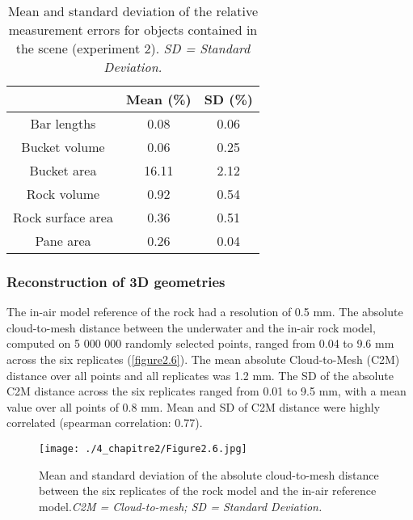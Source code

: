 \begin{table}[htbp]
  \centering
  \normalsize
  \caption[Mean and standard deviation of the relative measurement errors for objects contained in the scene]{Mean and standard deviation of the relative measurement errors for objects contained in the scene (experiment 2). \textit{SD = Standard Deviation.}}
  \label{table2.6}
  
\begin{tabular}{*{3}{c}}
        \toprule
                          & \textbf{Mean (\%)} & \textbf{SD (\%)} \\ \midrule
        Bar lengths       & 0.08               & 0.06             \\
        Bucket volume     & 0.06               & 0.25             \\
        Bucket area       & 16.11              & 2.12             \\
        Rock volume       & 0.92               & 0.54             \\
        Rock surface area & 0.36               & 0.51             \\
        Pane area         & 0.26               & 0.04             \\ \bottomrule
    \end{tabular}
\end{table}

\subsubsection{Reconstruction of 3D geometries}\label{chapitre2_3.2.3}
The in-air model reference of the rock had a resolution of 0.5 mm. The absolute cloud-to-mesh distance between the underwater and the in-air rock model, computed on 5 000 000 randomly selected points, ranged from 0.04 to 9.6 mm across the six replicates (\autoref{figure2.6}). The mean absolute Cloud-to-Mesh (C2M) distance over all points and all replicates was 1.2 mm. The SD of the absolute C2M distance across the six replicates ranged from 0.01 to 9.5 mm, with a mean value over all points of 0.8 mm. Mean and SD of C2M distance were highly correlated (spearman correlation: 0.77).

\begin{figure}[htbp]
	\texttt{[image: ./4\_chapitre2/Figure2.6.jpg]}
	\caption[Mean and standard deviation of the absolute cloud-to-mesh distance between the six replicates of the rock model and the in-air reference model.]{Mean and standard deviation of the absolute cloud-to-mesh distance between the six replicates of the rock model and the in-air reference model.\textit{C2M = Cloud-to-mesh; SD = Standard Deviation.}}
	\label{figure2.6}
\end{figure}


